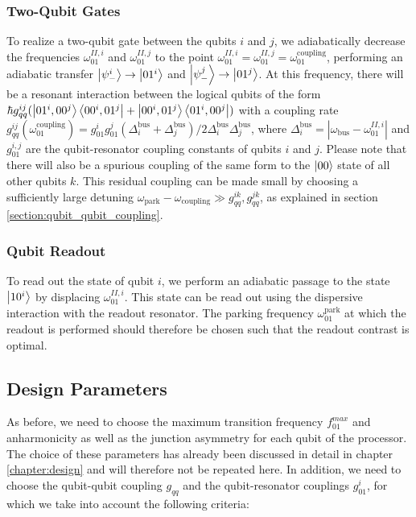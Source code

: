 \subsubsection{Two-Qubit Gates}

To realize a two-qubit gate between the qubits $i$ and $j$, we adiabatically decrease the frequencies $\omega_{01}^{II,i}$ and $\omega_{01}^{II,j}$ to the point $\omega_{01}^{II,i}=\omega_{01}^{II,j}=\omega_{01}^{\mathrm{coupling}}$, performing an adiabatic transfer $\left| \psi_-^i \right>\to\left| 01^i \right>$ and $\left| \psi_-^j \right>\to\left| 01^j \right>$. At this frequency, there will be a resonant interaction between the logical qubits of the form $\hbar g_{qq}^{ij}(\left| 01^i,00^j \right>\left< 00^i,01^j \right|+\left| 00^i,01^j \right>\left< 01^i,00^j \right|)$ with a coupling rate $g_{qq}^{ij}(\omega_{01}^\mathrm{coupling})=g_{01}^i g_{01}^j (\Delta_i^\mathrm{bus}+\Delta_j^\mathrm{bus})/2\Delta_i^{\mathrm{bus}}\Delta_j^\mathrm{bus}$, where $\Delta_i^\mathrm{bus}=|\omega_\mathrm{bus}-\omega_{01}^{II,i}|$ and $g_{01}^{i,j}$ are the qubit-resonator coupling constants of qubits $i$ and $j$. Please note that there will also be a spurious coupling of the same form to the $\left| 00 \right>$ state of all other qubits $k$. This residual coupling can be made small by choosing a sufficiently large detuning $\omega_\mathrm{park}-\omega_\mathrm{coupling} \gg g_{qq}^{ik},g_{qq}^{jk}$, as explained in section \ref{section:qubit_qubit_coupling}.

\subsubsection{Qubit Readout}

To read out the state of qubit $i$, we perform an adiabatic passage to the state $\left| 10^i \right>$ by displacing $\omega_{01}^{II,i}$. This state can be read out using the dispersive interaction with the readout resonator. The parking frequency $\omega_{01}^\mathrm{park}$ at which the readout is performed should therefore be chosen such that the readout contrast is optimal.

\subsection{Design Parameters}

As before, we need to choose the maximum transition frequency $f_{01}^{max}$ and anharmonicity as well as the junction asymmetry for each qubit of the processor. The choice of these parameters has already been discussed in detail in chapter \ref{chapter:design} and will therefore not be repeated here. In addition, we need to choose the qubit-qubit coupling $g_{qq}$ and the qubit-resonator couplings $g_{01}^i$, for which we take into account the following criteria:


